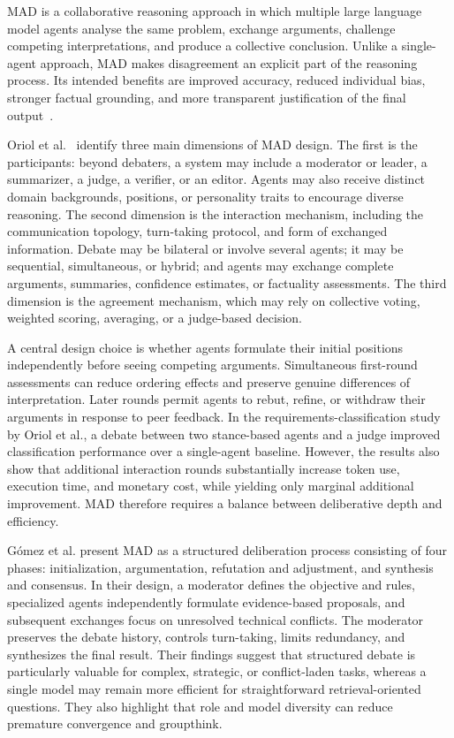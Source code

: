 \ac{MAD} is a collaborative reasoning approach in which multiple large language model agents analyse the same problem, exchange arguments, challenge competing interpretations, and produce a collective conclusion. Unlike a single-agent approach, \ac{MAD} makes disagreement an explicit part of the reasoning process. Its intended benefits are improved accuracy, reduced individual bias, stronger factual grounding, and more transparent justification of the final output~\cite{oriol2025mad,gomez2026structured}.

Oriol et al.~\cite{oriol2025mad} identify three main dimensions of \ac{MAD} design. The first is the participants: beyond debaters, a system may include a moderator or leader, a summarizer, a judge, a verifier, or an editor. Agents may also receive distinct domain backgrounds, positions, or personality traits to encourage diverse reasoning. The second dimension is the interaction mechanism, including the communication topology, turn-taking protocol, and form of exchanged information. Debate may be bilateral or involve several agents; it may be sequential, simultaneous, or hybrid; and agents may exchange complete arguments, summaries, confidence estimates, or factuality assessments. The third dimension is the agreement mechanism, which may rely on collective voting, weighted scoring, averaging, or a judge-based decision.

A central design choice is whether agents formulate their initial positions independently before seeing competing arguments. Simultaneous first-round assessments can reduce ordering effects and preserve genuine differences of interpretation. Later rounds permit agents to rebut, refine, or withdraw their arguments in response to peer feedback. In the requirements-classification study by Oriol et al., a debate between two stance-based agents and a judge improved classification performance over a single-agent baseline. However, the results also show that additional interaction rounds substantially increase token use, execution time, and monetary cost, while yielding only marginal additional improvement. \ac{MAD} therefore requires a balance between deliberative depth and efficiency.

Gómez et al.\cite{gomez2026structured} present \ac{MAD} as a structured deliberation process consisting of four phases: initialization, argumentation, refutation and adjustment, and synthesis and consensus. In their design, a moderator defines the objective and rules, specialized agents independently formulate evidence-based proposals, and subsequent exchanges focus on unresolved technical conflicts. The moderator preserves the debate history, controls turn-taking, limits redundancy, and synthesizes the final result. Their findings suggest that structured debate is particularly valuable for complex, strategic, or conflict-laden tasks, whereas a single model may remain more efficient for straightforward retrieval-oriented questions. They also highlight that role and model diversity can reduce premature convergence and groupthink.

